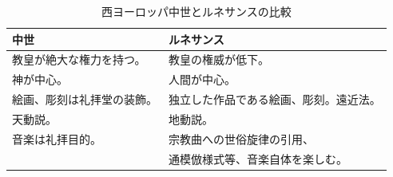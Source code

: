 \documentclass[a4j]{jarticle}
\begin{document}
\begin{table}[tb]
 \begin{center}
  \caption{西ヨーロッパ中世とルネサンスの比較}
  \label{tab:comparison}
  \begin{tabular}{|l|l|} \hline
  中世                       & ルネサンス                             \\
  \hline \hline
  教皇が絶大な権力を持つ。   & 教皇の権威が低下。                     \\ \hline
  神が中心。                 & 人間が中心。                           \\ \hline
  絵画、彫刻は礼拝堂の装飾。 & 独立した作品である絵画、彫刻。遠近法。 \\ \hline
  天動説。                   & 地動説。                               \\ \hline
  音楽は礼拝目的。           & 宗教曲への世俗旋律の引用、             \\
                             & 通模倣様式等、音楽自体を楽しむ。       \\ \hline
  \end{tabular}
 \end{center}
\end{table}
\end{document}

